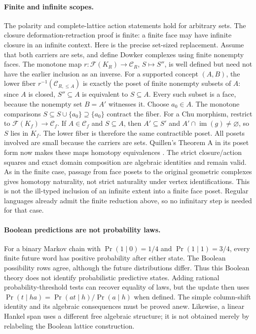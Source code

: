 \documentclass[11pt]{article}
\theoremstyle{remark}
\begin{document}
\paragraph{Finite and infinite scopes.}
The polarity and complete-lattice action statements hold for arbitrary
sets. The closure deformation-retraction proof is finite: a finite face
may have infinite closure in an infinite context. Here is the precise
set-sized replacement. Assume that both carriers are sets, and define
Dowker complexes using finite nonempty faces. The monotone map
$r:\mathcal F(K_R)\to\mathcal C_R$, $S\mapsto S''$, is well defined
but need not have the earlier inclusion as an inverse. For a supported
concept $(A,B)$, the lower fiber $r^{-1}(\mathcal C_{R,\leq A})$ is
exactly the poset of finite nonempty subsets of $A$: since $A$ is closed,
$S''\subseteq A$ is equivalent to $S\subseteq A$. Every such subset is
a face, because the nonempty set $B=A'$ witnesses it. Choose $a_0\in A$.
The monotone comparisons
$S\subseteq S\cup\{a_0\}\supseteq\{a_0\}$ contract the fiber.
For a Chu morphism, restrict to $\mathcal F(K_f)\to\mathcal C_f$.
If $A\in\mathcal C_f$ and $S\subseteq A$, then $A'\subseteq S'$ and
$A'\cap\operatorname{im}(g)\ne\varnothing$, so $S$ lies in $K_f$.
The lower fiber is therefore the same contractible poset. All posets
involved are small because the carriers are sets. Quillen's Theorem A
in its poset form now makes these maps homotopy equivalences
\cite{cg:quillen}. The strict closure/action squares and exact domain
composition are algebraic identities and remain valid. As in the finite
case, passage from face posets to the original geometric complexes gives
homotopy naturality, not strict naturality under vertex identifications.
This is not the ill-typed inclusion of an infinite extent into a finite
face poset. Regular languages already admit the finite reduction above,
so no infinitary step is needed for that case.

\paragraph{Boolean predictions are not probability laws.}
For a binary Markov chain with $\Pr(1\mid0)=1/4$ and
$\Pr(1\mid1)=3/4$, every finite future word has positive probability
after either state. The Boolean possibility rows agree, although the
future distributions differ. Thus this Boolean theory does not identify
probabilistic predictive states. Adding rational probability-threshold
tests can recover equality of laws, but the update then uses
$\Pr(t\mid ha)=\Pr(at\mid h)/\Pr(a\mid h)$ when defined. The simple
column-shift identity and its algebraic consequences must be proved anew.
Likewise, a linear Hankel span uses a different free algebraic structure;
it is not obtained merely by relabeling the Boolean lattice construction.
\end{document}
